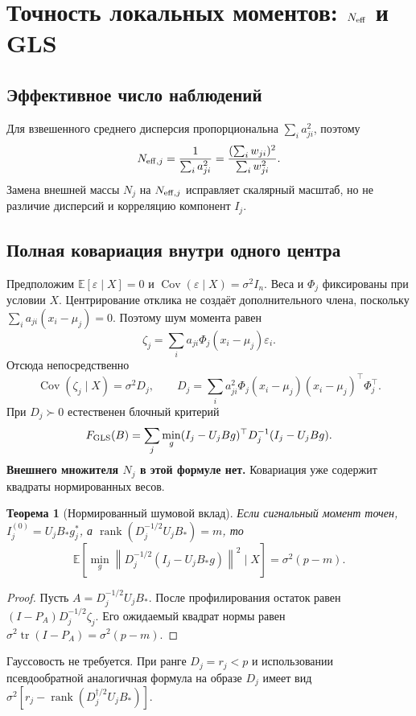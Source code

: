 \documentclass[11pt,a4paper]{article}
\newcommand{\norm}[1]{\left\lVert#1\right\rVert}
\newcommand{\tr}{\operatorname{tr}}
\newcommand{\rank}{\operatorname{rank}}
\newtheorem{theorem}{Теорема}
\begin{document}
\section{Точность локальных моментов: \texorpdfstring{$N_{\rm eff}$}{N-eff} и GLS}
\subsection{Эффективное число наблюдений}
Для взвешенного среднего дисперсия пропорциональна $\sum_i a_{ji}^2$,
поэтому
\begin{equation}\label{eq:neff}
 N_{{\rm eff},j}=\frac1{\sum_i a_{ji}^2}
 =\frac{(\sum_iw_{ji})^2}{\sum_iw_{ji}^2}.
\end{equation}
Замена внешней массы $N_j$ на $N_{{\rm eff},j}$ исправляет скалярный
масштаб, но не различие дисперсий и корреляцию компонент $I_j$.

\subsection{Полная ковариация внутри одного центра}
Предположим $\mathbb E[\varepsilon\mid X]=0$ и
$\operatorname{Cov}(\varepsilon\mid X)=\sigma^2 I_n$.
Веса и $\Phi_j$ фиксированы при условии $X$. Центрирование отклика
не создаёт дополнительного члена, поскольку
$\sum_i a_{ji}(x_i-\mu_j)=0$. Поэтому шум момента равен
\[
 \zeta_j=\sum_i a_{ji}\Phi_j(x_i-\mu_j)\varepsilon_i.
\]
Отсюда непосредственно
\begin{equation}\label{eq:covariance}
 \operatorname{Cov}(\zeta_j\mid X)=\sigma^2D_j,\qquad
 D_j=\sum_i a_{ji}^2\Phi_j(x_i-\mu_j)(x_i-\mu_j)^\top\Phi_j^\top.
\end{equation}
При $D_j\succ0$ естественен блочный критерий
\begin{equation}\label{eq:gls}
 F_{\rm GLS}(B)=\sum_j\min_g
 (I_j-U_jBg)^\top D_j^{-1}(I_j-U_jBg).
\end{equation}
\textbf{Внешнего множителя $N_j$ в этой формуле нет.}
Ковариация уже содержит квадраты нормированных весов.

\begin{theorem}[Нормированный шумовой вклад]
Если сигнальный момент точен, $I_j^{(0)}=U_jB_*g_j^*$,
а $\rank(D_j^{-1/2}U_jB_*)=m$, то
\[
 \mathbb E\!\left[\min_g\norm{D_j^{-1/2}(I_j-U_jB_*g)}^2\mid X\right]
 =\sigma^2(p-m).
\]
\end{theorem}
\begin{proof}
Пусть $A=D_j^{-1/2}U_jB_*$. После профилирования остаток равен
$(I-P_A)D_j^{-1/2}\zeta_j$. Его ожидаемый квадрат нормы равен
$\sigma^2\tr(I-P_A)=\sigma^2(p-m)$.
\end{proof}
Гауссовость не требуется. При ранге $D_j=r_j<p$ и использовании
псевдообратной аналогичная формула на образе $D_j$ имеет вид
$\sigma^2[r_j-\rank(D_j^{\dagger/2}U_jB_*)]$.
\end{document}
